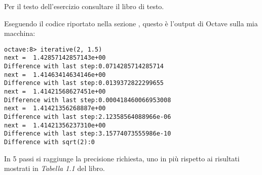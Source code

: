 \begin{exercise}[1.4] Per il testo dell'esercizio consultare il libro di testo.
\end{exercise}
Eseguendo il codice riportato nella sezione , 
questo \`e l'output di Octave sulla mia macchina:
\begin{lstlisting}
octave:8> iterative(2, 1.5)
next =  1.42857142857143e+00
Difference with last step:0.0714285714285714
next =  1.41463414634146e+00
Difference with last step:0.0139372822299655
next =  1.41421568627451e+00
Difference with last step:0.000418460066953008
next =  1.41421356268887e+00
Difference with last step:2.12358564088966e-06
next =  1.41421356237310e+00
Difference with last step:3.15774073555986e-10
Difference with sqrt(2):0
\end{lstlisting}
In 5 passi si raggiunge la precisione richiesta, uno in pi\`u rispetto ai risultati
mostrati in \emph{Tabella 1.1} del libro.



